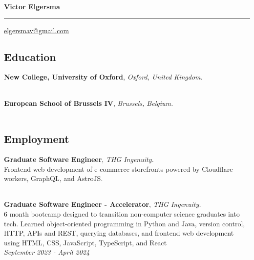 \documentclass[11pt, a4paper]{article}
\begin{document}
{\Large \textbf{Victor Elgersma}} 
\vspace{0.1cm} %

\hrule 
\vspace{0.1cm} %

\href{mailto:elgersmav@gmail.com}{elgersmav@gmail.com} 


\subsection*{Education}
    \begin{flushleft}
        \hspace{1cm}\textbf{New College, University of Oxford}, \textit{Oxford, United Kingdom.} \\
         \\
    \end{flushleft}

    \begin{flushleft}
        \hspace{1cm}\textbf{European School of Brussels IV}, \textit{Brussels, Belgium.} \\
        \hspace{1cm}{European Baccalaureate, 2018} \\
    \end{flushleft}

\subsection*{Employment}

\begin{flushleft}
    \hspace{1cm}\textbf{Graduate Software Engineer}, \textit{THG Ingenuity.} \\
    \hspace{1cm}\hangindent=1cm Frontend web development of e-commerce storefronts powered by Cloudflare workers, GraphQL, and AstroJS. \\
     \\
\end{flushleft}

\begin{flushleft}
    \hspace{1cm}\textbf{Graduate Software Engineer - Accelerator}, \textit{THG Ingenuity.} \\
    \hspace{1cm}\hangindent=1cm 6 month bootcamp designed to transition non-computer science graduates into tech. Learned object-oriented programming in Python and Java, version control, HTTP, APIs and REST, querying databases, and frontend web development using HTML, CSS, JavaScript, TypeScript, and React \\
    \hspace{1cm}\textit{{September 2023 - April 2024}} \\
\end{flushleft}
\end{document}

